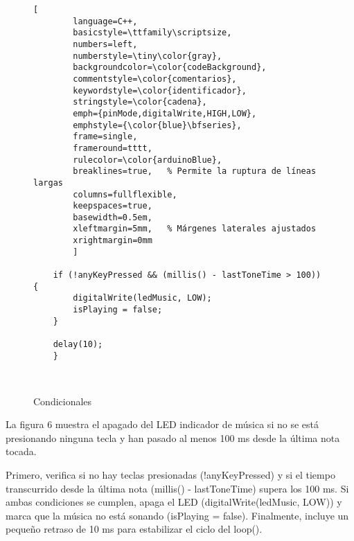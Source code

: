 
\setlength{\parindent}{0pt}
\setlength{\parskip}{6pt}
\begin{figure}[H]
	\centering
	\begin{lstlisting}[
		language=C++,
		basicstyle=\ttfamily\scriptsize,
		numbers=left,
		numberstyle=\tiny\color{gray},
		backgroundcolor=\color{codeBackground},
		commentstyle=\color{comentarios},
		keywordstyle=\color{identificador},
		stringstyle=\color{cadena},
		emph={pinMode,digitalWrite,HIGH,LOW},
		emphstyle={\color{blue}\bfseries},
		frame=single,
		frameround=tttt,
		rulecolor=\color{arduinoBlue},
		breaklines=true,   % Permite la ruptura de líneas largas
		columns=fullflexible,
		keepspaces=true,
		basewidth=0.5em,
		xleftmargin=5mm,   % Márgenes laterales ajustados
		xrightmargin=0mm
		]

	if (!anyKeyPressed && (millis() - lastToneTime > 100)) {
		digitalWrite(ledMusic, LOW);
		isPlaying = false;
	}
	
	delay(10);  
	}
	
		
	\end{lstlisting}
	\caption{Condicionales}
	\label{fig:codigo-led}
\end{figure}
La figura 6 muestra el apagado del LED indicador de música si no se está presionando ninguna tecla y han pasado al menos 100 ms desde la última nota tocada.

Primero, verifica si no hay teclas presionadas (!anyKeyPressed) y si el tiempo transcurrido desde la última nota (millis() - lastToneTime) supera los 100 ms. Si ambas condiciones se cumplen, apaga el LED (digitalWrite(ledMusic, LOW)) y marca que la música no está sonando (isPlaying = false). Finalmente, incluye un pequeño retraso de 10 ms para estabilizar el ciclo del loop().